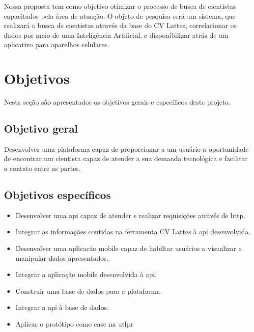 Nossa proposta tem como objetivo otimizar o processo de busca de cientistas capacitados pela área de atuação. O objeto de pesquisa será um sistema, que realizará a busca de cientistas através da base do CV Lattes, correlacionar os dados por meio de uma Inteligência Artificial, e disponíbilizar atrás de um aplicativo para aparelhos celulares.

\section{Objetivos}\label{sec:objetivos}

Nesta seção são apresentados os objetivos gerais e específicos deste projeto.

\subsection{Objetivo geral}\label{subsec:objetivoGeral}

Desenvolver uma plataforma capaz de proporcionar a um usuário a oportunidade de encontrar um cientista capaz de atender a sua demanda tecnológica e facilitar o contato entre as partes.

\subsection{Objetivos específicos}\label{subsec:objetivosEspecificos}

\begin{itemize}
    \item Desenvolver uma \gls{api} capaz de atender e realizar requisições através de \gls{http}.
    \item Integrar as informações contidas na ferramenta CV Lattes à \gls{api} desenvolvida.
    \item Desenvolver uma aplicacão mobile capaz de habiltar usuários a visualizar e manipular dados apresentados.
    \item Integrar a aplicação mobile desenvolvida à \gls{api}.
    \item Construir uma base de dados para a plataforma.
    \item Integrar a \gls{api} à base de dados.
    \item Aplicar o protótipo como case na \gls{utfpr}
\end{itemize}

